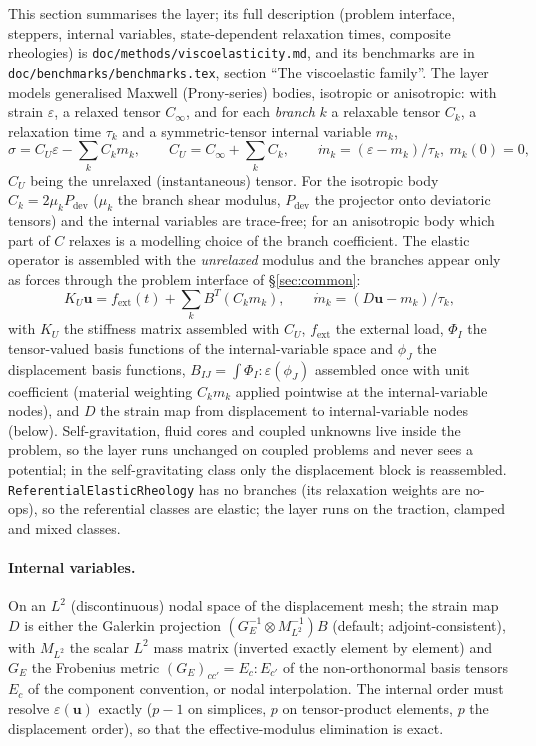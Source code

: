 \documentclass[11pt]{article}
\numberwithin{equation}{section}
\theoremstyle{remark}
\newcommand{\eps}{\varepsilon}
\newcommand{\vu}{\mathbf{u}}
\newcommand{\code}[1]{\texttt{#1}}
\begin{document}
This section summarises the layer; its full description (problem
interface, steppers, internal variables, state-dependent relaxation times,
composite rheologies) is \code{doc/methods/viscoelasticity.md}, and its benchmarks
are in \code{doc/benchmarks/benchmarks.tex}, section ``The viscoelastic family''.
The layer models generalised Maxwell (Prony-series) bodies, isotropic or
anisotropic: with strain $\eps$, a relaxed tensor $C_\infty$, and for each
\emph{branch} $k$ a relaxable tensor $C_k$, a relaxation time $\tau_k$ and a
symmetric-tensor internal variable $m_k$,
\begin{equation}
  \sigma = C_U\eps - \sum_k C_km_k, \qquad C_U = C_\infty + \sum_kC_k,
  \qquad \dot m_k = (\eps - m_k)/\tau_k,\ m_k(0) = 0 ,
\end{equation}
$C_U$ being the unrelaxed (instantaneous) tensor. For the isotropic body
$C_k = 2\mu_kP_{\mathrm{dev}}$ ($\mu_k$ the branch shear modulus,
$P_{\mathrm{dev}}$ the projector onto deviatoric tensors) and the internal
variables are trace-free; for an anisotropic body which part of $C$ relaxes
is a modelling choice of the branch coefficient. The elastic operator is
assembled with the \emph{unrelaxed} modulus and the branches appear only as
forces through the problem interface of \S\ref{sec:common}:
\begin{equation}
  K_U\vu = f_{\mathrm{ext}}(t) + \sum_kB^T(C_km_k), \qquad
  \dot m_k = (D\vu - m_k)/\tau_k,
\end{equation}
with $K_U$ the stiffness matrix assembled with $C_U$, $f_{\mathrm{ext}}$
the external load, $\Phi_I$ the tensor-valued basis functions of the
internal-variable space and $\phi_J$ the displacement basis functions,
$B_{IJ} = \int\Phi_I:\eps(\phi_J)$ assembled once with unit coefficient
(material weighting $C_km_k$ applied pointwise at the internal-variable
nodes), and $D$ the strain map from displacement to internal-variable
nodes (below). Self-gravitation, fluid cores and coupled unknowns live inside
the problem, so the layer runs unchanged on coupled problems and never sees
a potential; in the self-gravitating class only the displacement block is
reassembled. \code{ReferentialElasticRheology} has no branches (its
relaxation weights are no-ops), so the referential classes are elastic;
the layer runs on the traction, clamped and mixed classes.

\paragraph{Internal variables.} On an $L^2$ (discontinuous) nodal space of
the displacement mesh; the strain map $D$ is either the Galerkin projection
$(G_E^{-1}\otimes M_{L^2}^{-1})B$ (default; adjoint-consistent), with
$M_{L^2}$ the scalar $L^2$ mass matrix (inverted exactly element by
element) and $G_E$ the Frobenius metric $(G_E)_{cc'} = E_c:E_{c'}$ of the
non-orthonormal basis tensors $E_c$ of the component convention, or nodal
interpolation. The internal order must resolve $\eps(\vu)$ exactly ($p-1$
on simplices, $p$ on tensor-product elements, $p$ the displacement order),
so that the effective-modulus elimination is exact.
\end{document}
